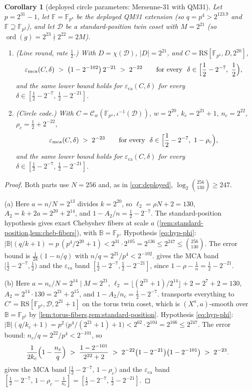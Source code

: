 \documentclass[11pt]{article}
\newtheorem{corollary}[corollary]{Corollary}
\theoremstyle{definition}
\theoremstyle{remark}
\newcommand{\F}{\mathbb{F}}
\newcommand{\B}{\mathbb{B}}
\newcommand{\RS}{\mathrm{RS}}
\newcommand{\eca}{\varepsilon_{\mathrm{ca}}}
\newcommand{\emca}{\varepsilon_{\mathrm{mca}}}
\begin{document}
\begin{corollary}[deployed circle parameters: Mersenne-31 with QM31]\label{cor:circle-deployed}
Let $p=2^{31}-1$, let $\F=\F_{p^4}$ be the deployed QM31 extension \textup(so $q=p^4>2^{123.9}$ and $\F\supseteq\F_{p^2}$\textup), and let $\mathcal D$ be a standard-position twin coset with $M=2^{21}$ \textup(so $\operatorname{ord}(g)=2^{23}\nmid2^{22}=2M$\textup).
\begin{enumerate}[label=\textup{(\alph*)}]
\item \textup{(Line round, rate $\frac12$.)} With $D=\chi(\mathcal D)$, $|D|=2^{21}$, and $C=\RS[\F_{p^4},D,2^{20}]$,
\[
\emca(C,\delta)\;>\;\bigl(1-2^{-102}\bigr)\,2^{-21}\;>\;2^{-22}
\qquad\text{for every }\ \delta\in\Bigl[\frac12-2^{-7},\ \frac12\Bigr),
\]
and the same lower bound holds for $\eca(C,\delta)$ for every $\delta\in[\frac12-2^{-7},\,\frac12-2^{-21}]$.
\item \textup{(Circle code.)} With $C=\mathcal C_w(\F_{p^4},\iota^{-1}(\mathcal D))$, $w=2^{20}$, $k_c=2^{21}+1$, $n_c=2^{22}$, $\rho_c=\frac12+2^{-22}$,
\[
\emca(C,\delta)\;>\;2^{-23}
\qquad\text{for every }\ \delta\in\Bigl[\frac12-2^{-7},\ 1-\rho_c\Bigr),
\]
and the same lower bound holds for $\eca(C,\delta)$ for every $\delta\in[\frac12-2^{-7},\,\frac12-2^{-21}]$.
\end{enumerate}
\end{corollary}

\begin{proof}
Both parts use $N=256$ and, as in \cref{cor:deployed}, $\log_2\binom{256}{130}\ge247$.

(a) Here $a=n/N=2^{13}$ divides $k=2^{20}$, so $\ell_2=\rho N+2=130$, $A_2=k+2a=2^{20}+2^{14}$, and $1-A_2/n=\frac12-2^{-7}$. The standard-position hypothesis gives exact Chebyshev fibers at scale $a$ (\cref{rem:standard-position,lem:cheb-fibers}), with $\B=\F_p$. Hypothesis \eqref{eq:hyp-phi}: $|\B|(q/k+1)=p\,(p^4/2^{20}+1)<2^{31}\cdot2^{105}=2^{136}\le2^{247}\le\binom{256}{130}$. The error bound is $\frac1{2k}(1-n/q)$ with $n/q=2^{21}/p^4<2^{-102}$.  gives the MCA band $[\frac12-2^{-7},\frac12)$ and the $\eca$ band $[\frac12-2^{-7},\frac12-2^{-21}]$, since $1-\rho-\frac1n=\frac12-2^{-21}$.

(b) Here $a=n_c/N=2^{14}\mid M=2^{21}$, $\ell_2=\lfloor(2^{21}+1)/2^{14}\rfloor+2=2^7+2=130$, $A_2=2^{14}\cdot130=2^{21}+2^{15}$, and $1-A_2/n_c=\frac12-2^{-7}$.  transports everything to $C'=\RS[\F_{p^4},\mathcal D,2^{21}+1]$ on the torus twin coset, which is $(X^a,a)$-smooth over $\B=\F_{p^2}$ by \cref{lem:torus-fibers,rem:standard-position}. Hypothesis \eqref{eq:hyp-phi}: $|\B|(q/k_c+1)=p^2\,\bigl(p^4/(2^{21}+1)+1\bigr)<2^{62}\cdot2^{104}=2^{166}\le2^{247}$. The error bound: $n_c/q=2^{22}/p^4<2^{-101}$, so
\[
\frac1{2k_c}\Bigl(1-\frac{n_c}q\Bigr)\;>\;\frac{1-2^{-101}}{2^{22}+2}\;>\;2^{-22}\bigl(1-2^{-21}\bigr)\bigl(1-2^{-101}\bigr)\;>\;2^{-23}.
\]
 gives the MCA band $[\frac12-2^{-7},\,1-\rho_c)$ and the $\eca$ band $[\frac12-2^{-7},\,1-\rho_c-\frac1{n_c}]=[\frac12-2^{-7},\,\frac12-2^{-21}]$.
\end{proof}
\end{document}
